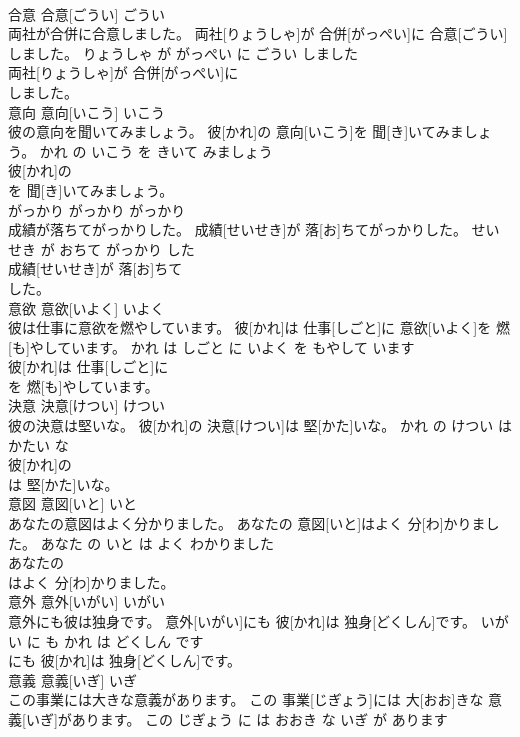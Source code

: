 \documentclass[8pt]{extreport}
\begin{document}
\begin{CJK}{UTF8}{min}
\\	合意	合意[ごうい]	ごうい	
\\	両社が合併に合意しました。	両社[りょうしゃ]が 合併[がっぺい]に 合意[ごうい]しました。	りょうしゃ が がっぺい に ごうい しました	
\\	両社[りょうしゃ]が 合併[がっぺい]に
\\	しました。			
\\	意向	意向[いこう]	いこう	
\\	彼の意向を聞いてみましょう。	彼[かれ]の 意向[いこう]を 聞[き]いてみましょう。	かれ の いこう を きいて みましょう	
\\	彼[かれ]の
\\	を 聞[き]いてみましょう。			
\\	がっかり	がっかり	がっかり	
\\	成績が落ちてがっかりした。	成績[せいせき]が 落[お]ちてがっかりした。	せいせき が おちて がっかり した	
\\	成績[せいせき]が 落[お]ちて
\\	した。			
\\	意欲	意欲[いよく]	いよく	
\\	彼は仕事に意欲を燃やしています。	彼[かれ]は 仕事[しごと]に 意欲[いよく]を 燃[も]やしています。	かれ は しごと に いよく を もやして います	
\\	彼[かれ]は 仕事[しごと]に
\\	を 燃[も]やしています。			
\\	決意	決意[けつい]	けつい	
\\	彼の決意は堅いな。	彼[かれ]の 決意[けつい]は 堅[かた]いな。	かれ の けつい は かたい な	
\\	彼[かれ]の
\\	は 堅[かた]いな。			
\\	意図	意図[いと]	いと	
\\	あなたの意図はよく分かりました。	あなたの 意図[いと]はよく 分[わ]かりました。	あなた の いと は よく わかりました	
\\	あなたの
\\	はよく 分[わ]かりました。			
\\	意外	意外[いがい]	いがい	
\\	意外にも彼は独身です。	意外[いがい]にも 彼[かれ]は 独身[どくしん]です。	いがい に も かれ は どくしん です	
\\	にも 彼[かれ]は 独身[どくしん]です。			
\\	意義	意義[いぎ]	いぎ	
\\	この事業には大きな意義があります。	この 事業[じぎょう]には 大[おお]きな 意義[いぎ]があります。	この じぎょう に は おおき な いぎ が あります	

\end{CJK}
\end{document}
